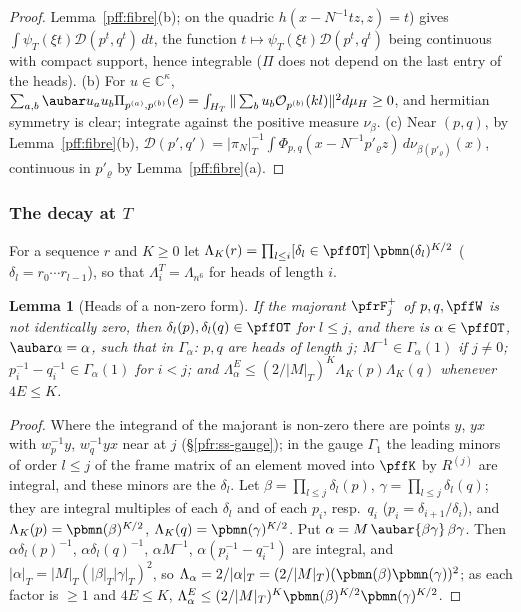 \documentclass[10pt]{amsart}
\newtheorem{lemma}[theorem]{Lemma}
\theoremstyle{definition}
\theoremstyle{remark}
\newcommand{\C}{\mathbb C}
\begin{document}
\begin{proof}
Lemma~\ref{pff:fibre}(b); on the quadric $h(x-N^{-1}tz,z)=t$) gives $\int\psi_T(\xi t)\mathcal D(p^t,q^t)\,dt$, the function
$t\mapsto\psi_T(\xi t)\mathcal D(p^t,q^t)$ being continuous with compact support, hence integrable ($\Pi$ does not depend on the
last entry of the heads).
(b) For $u\in\C^\kappa$, $\sum_{a,b}\aubar u_au_b\Pi_{p^{(a)},p^{(b)}}(e)=\int_{H_T}\|\sum_bu_b\mathcal
O_{p^{(b)}}(kl)\|^2d\mu_H\ge0$, and hermitian symmetry is clear; integrate against the positive
measure $\nu_\beta$.
(c) Near $(p,q)$, by Lemma~\ref{pff:fibre}(b), $\mathcal D(p',q')=|\pi_N|_T^{-1}\int\Phi_{p,q}(x-N^{-1}
p'_\varrho z)\,d\nu_{\beta(p'_\varrho)}(x)$, continuous in $p'_\varrho$ by Lemma~\ref{pff:fibre}(a).
\end{proof}

\subsubsection*{The decay at $T$}
For a sequence $r$ and $K\ge0$ let $\Lambda_K(r)=\prod_{l\le i}[\delta_l\in\pffOT]\,\pbmn(\delta_l)^{K/2}$
($\delta_l=r_0\cdots r_{l-1}$), so that $\Lambda^T_i=\Lambda_{n^6}$ for heads of length $i$.

\begin{lemma}[Heads of a non-zero form]\label{pff:heads}
If the majorant $\pfrF^+_j$ of $p,q,\pffW$ is not identically zero, then $\delta_l(p),\delta_l(q)\in
\pffOT$ for $l\le j$, and there is $\alpha\in\pffOT$, $\aubar\alpha=\alpha$, such that in $\Gamma_\alpha$:
$p,q$ are heads of length $j$; $M^{-1}\in\Gamma_\alpha(1)$ if $j\ne0$; $p_i^{-1}-q_i^{-1}\in
\Gamma_\alpha(1)$ for $i<j$; and $\Lambda_\alpha^E\le(2/|M|_T)^K\Lambda_K(p)\Lambda_K(q)$ whenever
$4E\le K$.
\end{lemma}
\begin{proof}
Where the integrand of the majorant is non-zero there are points $y$, $yx$ with
$w_p^{-1}y$, $w_q^{-1}yx$ near at $j$ (\S\ref{pfr:ss-gauge}); in the gauge $\Gamma_1$ the leading
minors of order $l\le j$ of the frame matrix of an element moved into $\pffK$ by $R^{(j)}$ are integral, and
these minors are the $\delta_l$. Let $\beta=\prod_{l\le j}\delta_l(p)$, $\gamma=\prod_{l\le j}\delta_l(q)$;
they are integral multiples of each $\delta_l$ and of each $p_i$, resp.\ $q_i$ ($p_i=\delta_{i+1}/\delta_i$),
and $\Lambda_K(p)=\pbmn(\beta)^{K/2}$, $\Lambda_K(q)=\pbmn(\gamma)^{K/2}$. Put $\alpha=M\,\aubar{\beta\gamma}\,
\beta\gamma$. Then $\alpha\delta_l(p)^{-1}$, $\alpha\delta_l(q)^{-1}$, $\alpha M^{-1}$, $\alpha(p_i^{-1}-q_i^{-1})$
are integral, and $|\alpha|_T=|M|_T(|\beta|_T|\gamma|_T)^2$, so $\Lambda_\alpha=2/|\alpha|_T=(2/|M|_T)(\pbmn
(\beta)\pbmn(\gamma))^2$; as each factor is $\ge1$ and $4E\le K$, $\Lambda_\alpha^E\le(2/|M|_T)^K\pbmn(\beta)^{K/2}
\pbmn(\gamma)^{K/2}$.
\end{proof}
\end{document}

